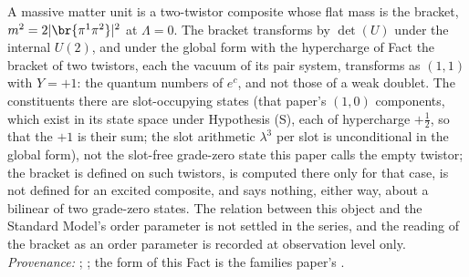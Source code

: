 A massive matter unit is a two-twistor composite whose flat mass is the bracket, $m^{2} = 2|\br{\pi^{1}\pi^{2}}|^{2}$ at $\Lambda = 0$. The bracket transforms by $\det(U)$ under the internal $U(2)$, and under the global form with the hypercharge of Fact  the bracket of two twistors, each the vacuum of its pair system, transforms as $(1,1)$ with $Y = +1$: the quantum numbers of $e^{c}$, and not those of a weak doublet. The constituents there are slot-occupying states (that paper's $(1,0)$ components, which exist in its state space under Hypothesis (S), each of hypercharge $+\tfrac12$, so that the $+1$ is their sum; the slot arithmetic $\lambda^{3}$ per slot is unconditional in the global form), not the slot-free grade-zero state this paper calls the empty twistor; the bracket is defined on such twistors, is computed there only for that case, is not defined for an excited composite, and says nothing, either way, about a bilinear of two grade-zero states. The relation between this object and the Standard Model's order parameter is not settled in the series, and the reading of the bracket as an order parameter is recorded at observation level only. \emph{Provenance:} \cite[Props.~3.1-3.2]{ButlerT12}; \cite[Prop.~4.1]{ButlerT11}; the form of this Fact is the families paper's \cite[Fact~2.1]{ButlerT13}.
